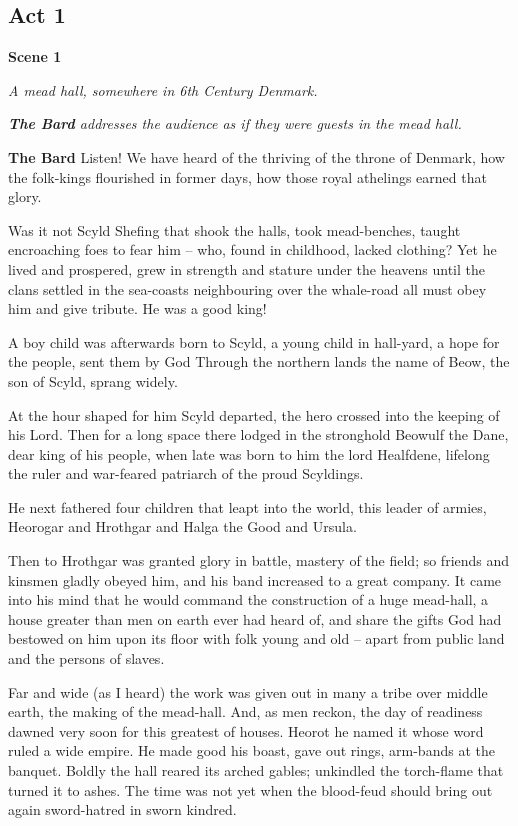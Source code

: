 \documentclass[a4paper]{article}
\begin{document}
\subsection{Act 1}%

{\linewise

\centerline{\textbf{Scene 1}}
\centerline{\textit{A mead hall, somewhere in 6th Century Denmark.}}
\centerline{\textit{\textbf{The Bard} addresses the audience as if they were guests in the mead hall.}}

\textbf{The Bard} Listen!
We have heard of the thriving of the throne of Denmark,
how the folk-kings flourished in former days,
how those royal athelings earned that glory.

Was it not Scyld Shefing that shook the halls,
took mead-benches, taught encroaching
foes to fear him – who, found in childhood,
lacked clothing? Yet he lived and prospered,
grew in strength and stature under the heavens
until the clans settled in the sea-coasts neighbouring
over the whale-road all must obey him
and give tribute. He was a good king!

A boy child was afterwards born to Scyld,
a young child in hall-yard, a hope for the people,
sent them by God
Through the northern lands the name of Beow,
the son of Scyld, sprang widely.

At the hour shaped for him Scyld departed,
the hero crossed into the keeping of his Lord.
Then for a long space there lodged in the stronghold
Beowulf the Dane, dear king of his people,
when late was born to him
the lord Healfdene, lifelong the ruler
and war-feared patriarch of the proud Scyldings.

He next fathered four children
that leapt into the world, this leader of armies,
Heorogar and Hrothgar and Halga the Good and Ursula.

Then to Hrothgar was granted glory in battle,
mastery of the field; so friends and kinsmen
gladly obeyed him, and his band increased
to a great company. It came into his mind
that he would command the construction
of a huge mead-hall, a house greater
than men on earth ever had heard of,
and share the gifts God had bestowed on him
upon its floor with folk young and old –
apart from public land and the persons of slaves.

Far and wide (as I heard) the work was given out
in many a tribe over middle earth,
the making of the mead-hall. And, as men reckon,
the day of readiness dawned very soon
for this greatest of houses. Heorot he named it
whose word ruled a wide empire.
He made good his boast, gave out rings,
arm-bands at the banquet. Boldly the hall reared
its arched gables; unkindled the torch-flame
that turned it to ashes. The time was not yet
when the blood-feud should bring out again
sword-hatred in sworn kindred.

}
\end{document}
